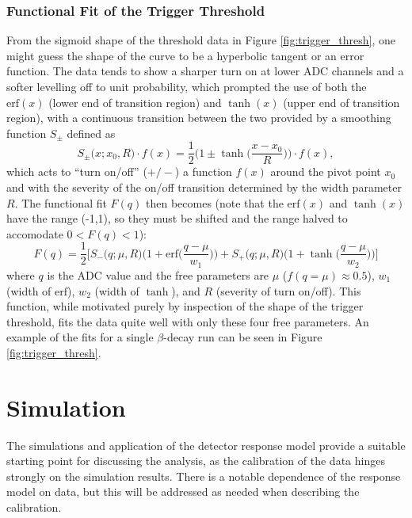 \subsubsection{Functional Fit of the Trigger Threshold}
From the sigmoid shape of the threshold data in Figure \ref{fig:trigger_thresh}, one might guess
the shape of the curve to be a hyperbolic tangent or an error function. The data tends to show
a sharper turn on at lower ADC channels and a softer levelling off to unit probability, which
prompted the use of both the $\mathrm{erf}(x)$ (lower end of transition region)
and $\tanh(x)$ (upper end of transition region),
with a continuous transition between the
two provided by a smoothing function $S_\pm$ defined as
%
\begin{equation}
  S_\pm\big(x;x_0,R\big) \cdot f(x) = \frac{1}{2}\bigg(1\pm\tanh\Big(\frac{x-x_0}{R}\Big)\bigg) \cdot f(x),
\end{equation}
%
which acts to ``turn on/off'' ($+/-$) a function $f(x)$ around the pivot point $x_0$ and with the severity of
the on/off transition determined by the width parameter $R$. The functional fit $F(q)$ then becomes (note that the $\mathrm{erf}(x)$ and $\tanh(x)$ 
have the range (-1,1), so they must be shifted and the range halved to accomodate $0<F(q)<1$):
%
\begin{equation}
  F(q) = \frac{1}{2} \Bigg[ S_-\big(q;\mu,R\big) \bigg(1 + \mathrm{erf}\Big(\frac{q-\mu}{w_1}\Big)\bigg) +
  S_+\big(q;\mu,R\big) \bigg(1+\tanh\Big(\frac{q-\mu}{w_2}\Big)\bigg)\Bigg]
\end{equation}
%
where $q$ is the ADC value and
the free parameters are $\mu$ ($f(q=\mu)\approx 0.5$), $w_1$ (width of $\mathrm{erf}$), $w_2$ (width of $\tanh$), and $R$ (severity of turn on/off).
This function, while motivated purely by inspection of the shape of the trigger threshold, fits the data
quite well with only these four free parameters. An example of the fits for a single $\beta$-decay
run can be seen in Figure \ref{fig:trigger_thresh}. 



\section{Simulation}
\label{sec:Simulation}

The simulations and application of the
detector response model provide a suitable starting
point for discussing the analysis, as the calibration of the data hinges
strongly on the simulation results. There is a notable dependence of the
response model on data, but this will be addressed as needed
when describing the calibration.

